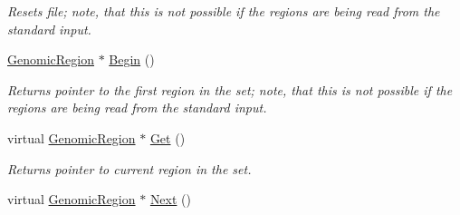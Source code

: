 \begin{CompactItemize}
\begin{CompactList}\small\item\em Resets file; note, that this is not possible if the regions are being read from the standard input. \item\end{CompactList}\item 
\hypertarget{classGenomicRegionSet_06e2e8f91623c01e6e00500888b9ba3d}{
\hyperlink{classGenomicRegion}{GenomicRegion} $\ast$ \hyperlink{classGenomicRegionSet_06e2e8f91623c01e6e00500888b9ba3d}{Begin} ()}
\label{classGenomicRegionSet_06e2e8f91623c01e6e00500888b9ba3d}

\begin{CompactList}\small\item\em Returns pointer to the first region in the set; note, that this is not possible if the regions are being read from the standard input. \item\end{CompactList}\item 
\hypertarget{classGenomicRegionSet_77031066d2648c8935c291ef227b37be}{
virtual \hyperlink{classGenomicRegion}{GenomicRegion} $\ast$ \hyperlink{classGenomicRegionSet_77031066d2648c8935c291ef227b37be}{Get} ()}
\label{classGenomicRegionSet_77031066d2648c8935c291ef227b37be}

\begin{CompactList}\small\item\em Returns pointer to current region in the set. \item\end{CompactList}\item 
\hypertarget{classGenomicRegionSet_4f7501a27d13cae65247686182b78d51}{
virtual \hyperlink{classGenomicRegion}{GenomicRegion} $\ast$ \hyperlink{classGenomicRegionSet_4f7501a27d13cae65247686182b78d51}{Next} ()}
\label{classGenomicRegionSet_4f7501a27d13cae65247686182b78d51}


\end{CompactItemize}
